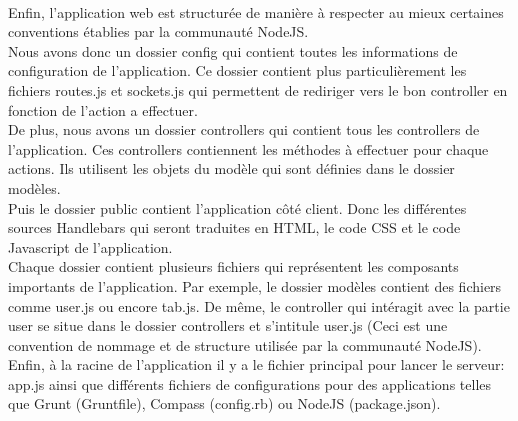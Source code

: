 \paragraph{}
Enfin, l'application web est structurée de manière à respecter au mieux certaines conventions établies par la communauté NodeJS. \\
Nous avons donc un dossier config qui contient toutes les informations de configuration de l'application. Ce dossier contient plus particulièrement les fichiers routes.js et sockets.js qui permettent de rediriger vers le bon controller en fonction de l'action a effectuer. \\
De plus, nous avons un dossier controllers qui contient tous les controllers de l'application. Ces controllers contiennent les méthodes à effectuer pour chaque actions. Ils utilisent les objets du modèle qui sont définies dans le dossier modèles. \\
Puis le dossier public contient l'application côté client. Donc les différentes sources Handlebars qui seront traduites en HTML, le code CSS et le code Javascript de l'application. \\
Chaque dossier contient plusieurs fichiers qui représentent les composants importants de l'application. Par exemple, le dossier modèles contient des fichiers comme user.js ou encore tab.js. De même, le controller qui intéragit avec la partie user se situe dans le dossier controllers et s'intitule user.js (Ceci est une convention de nommage et de structure utilisée par la communauté NodeJS). \\
Enfin, à la racine de l'application il y a le fichier principal pour lancer le serveur: app.js ainsi que différents fichiers de configurations pour des applications telles que Grunt (Gruntfile), Compass (config.rb) ou NodeJS (package.json). \\

